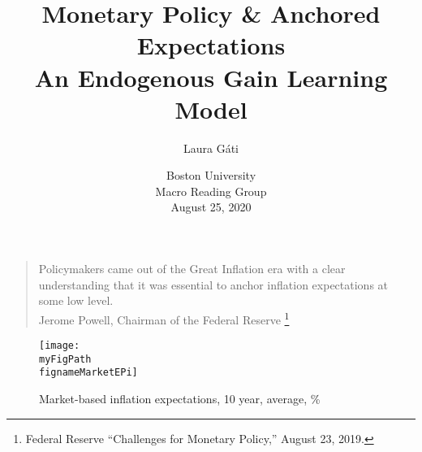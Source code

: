 \documentclass[10pt]{beamer}
\author[]{Laura G\'ati}
\institute[]{Boston College}
\title[]{Monetary Policy \& Anchored Expectations \\
An Endogenous Gain Learning Model}
\date[]{Boston University\\ \vspace{0.2cm} Macro Reading Group \\ \vspace{0.5cm} August 25, 2020}
\def \myFigPath {../../../figures/}
\def\myTinyFigScale{0.16}
\def\fignameMarketEPi{epi10_2020_06_04}
\begin{document}
\begin{frame}[plain] %

\maketitle

\end{frame}




\begin{frame}\label{motivation}
	
\begin{quote}
Policymakers came out of the Great Inflation era with a clear understanding that it was essential to anchor inflation expectations at some low level. \\
Jerome Powell, Chairman of the Federal Reserve \footnote{Federal Reserve ``Challenges for Monetary Policy,''  August 23, 2019.}
\end{quote}	

\begin{figure}[h!]
\texttt{[image: \\myFigPath \\fignameMarketEPi]}
\caption{Market-based inflation expectations, 10 year, average, \%}
\label{epi}
\end{figure}



\vspace{-0.5cm}
\hfill \hyperlink{app_TIPS}{}
\end{frame}
\end{document}
